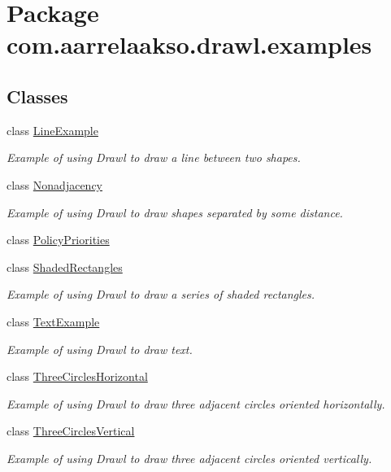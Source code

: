 \hypertarget{namespacecom_1_1aarrelaakso_1_1drawl_1_1examples}{}\section{Package com.\+aarrelaakso.\+drawl.\+examples}
\label{namespacecom_1_1aarrelaakso_1_1drawl_1_1examples}
\subsection*{Classes}
\begin{DoxyCompactItemize}
\item 
class \hyperlink{classcom_1_1aarrelaakso_1_1drawl_1_1examples_1_1_line_example}{Line\+Example}
\begin{DoxyCompactList}\small\item\em Example of using Drawl to draw a line between two shapes. \end{DoxyCompactList}\item 
class \hyperlink{classcom_1_1aarrelaakso_1_1drawl_1_1examples_1_1_nonadjacency}{Nonadjacency}
\begin{DoxyCompactList}\small\item\em Example of using Drawl to draw shapes separated by some distance. \end{DoxyCompactList}\item 
class \hyperlink{classcom_1_1aarrelaakso_1_1drawl_1_1examples_1_1_policy_priorities}{Policy\+Priorities}
\item 
class \hyperlink{classcom_1_1aarrelaakso_1_1drawl_1_1examples_1_1_shaded_rectangles}{Shaded\+Rectangles}
\begin{DoxyCompactList}\small\item\em Example of using Drawl to draw a series of shaded rectangles. \end{DoxyCompactList}\item 
class \hyperlink{classcom_1_1aarrelaakso_1_1drawl_1_1examples_1_1_text_example}{Text\+Example}
\begin{DoxyCompactList}\small\item\em Example of using Drawl to draw text. \end{DoxyCompactList}\item 
class \hyperlink{classcom_1_1aarrelaakso_1_1drawl_1_1examples_1_1_three_circles_horizontal}{Three\+Circles\+Horizontal}
\begin{DoxyCompactList}\small\item\em Example of using Drawl to draw three adjacent circles oriented horizontally. \end{DoxyCompactList}\item 
class \hyperlink{classcom_1_1aarrelaakso_1_1drawl_1_1examples_1_1_three_circles_vertical}{Three\+Circles\+Vertical}
\begin{DoxyCompactList}\small\item\em Example of using Drawl to draw three adjacent circles oriented vertically. \end{DoxyCompactList}\end{DoxyCompactItemize}
